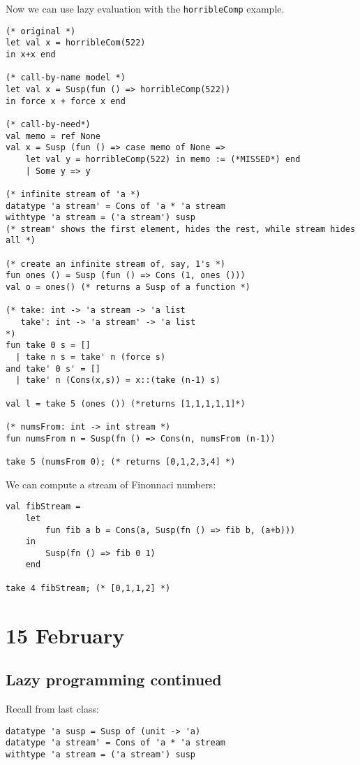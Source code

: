 \documentclass[11pt]{article}
\begin{document}
Now we can use lazy evaluation with the \verb~horribleComp~ example.

\begin{verbatim}
(* original *)
let val x = horribleCom(522)
in x+x end

(* call-by-name model *)
let val x = Susp(fun () => horribleComp(522))
in force x + force x end

(* call-by-need*)
val memo = ref None
val x = Susp (fun () => case memo of None =>
    let val y = horribleComp(522) in memo := (*MISSED*) end
	| Some y => y

(* infinite stream of 'a *)
datatype 'a stream' = Cons of 'a * 'a stream
withtype 'a stream = ('a stream') susp
(* stream' shows the first element, hides the rest, while stream hides all *)

(* create an infinite stream of, say, 1's *)
fun ones () = Susp (fun () => Cons (1, ones ()))
val o = ones() (* returns a Susp of a function *)

(* take: int -> 'a stream -> 'a list
   take': int -> 'a stream' -> 'a list
*)
fun take 0 s = []
  | take n s = take' n (force s)
and take' 0 s' = []
  | take' n (Cons(x,s)) = x::(take (n-1) s)

val l = take 5 (ones ()) (*returns [1,1,1,1,1]*)

(* numsFrom: int -> int stream *)
fun numsFrom n = Susp(fn () => Cons(n, numsFrom (n-1))

take 5 (numsFrom 0); (* returns [0,1,2,3,4] *)
\end{verbatim}

We can compute a stream of Finonnaci numbers:
\begin{verbatim}
val fibStream =
    let
        fun fib a b = Cons(a, Susp(fn () => fib b, (a+b)))
    in
        Susp(fn () => fib 0 1)
    end

take 4 fibStream; (* [0,1,1,2] *)
\end{verbatim}

\section{15 February}
\subsection{Lazy programming continued}

Recall from last class:

\begin{verbatim}
datatype 'a susp = Susp of (unit -> 'a)
datatype 'a stream' = Cons of 'a * 'a stream
withtype 'a stream = ('a stream') susp
\end{verbatim}
\end{document}
